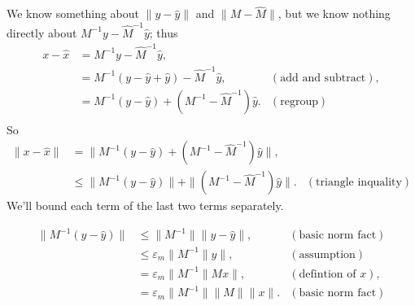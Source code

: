 \documentclass[usenames,dvipsnames,fleqn]{beamer}
\theoremstyle{definition}
\begin{document}
\begin{frame}

We know something about \(\| y - \widehat y\| \) and  \( \| M  - \widehat M \| \), but we know nothing directly about
\(M^{-1} y - \widehat M^{-1} \widehat y\); thus
\begin{align*}
   x - \widehat x &= M^{-1} y - \widehat M^{-1} \widehat y, \\
       &=M^{-1} \left(y - \widehat y + \widehat y \right)  - \widehat M^{-1} \widehat y, &(\mbox{add and subtract}), \\
       &= M^{-1} \left(y - \widehat y \right) + \left(M^{-1} - \widehat M^{-1} \right) \widehat y.  &(\mbox{regroup})\\
\end{align*}
So
\begin{align*}
  \|  x - \widehat x \| &= \|M^{-1} \left(y - \widehat y \right) + \left(M^{-1} - \widehat M^{-1} \right) \widehat y \|,\\
       &\leq  \|M^{-1} \left(y - \widehat y \right) \| + \| \left(M^{-1} - \widehat M^{-1} \right) \widehat y \|. &(\mbox{triangle inquality})
\end{align*}
We'll bound each term of the last two terms separately.

\end{frame}
\begin{frame}

\begin{align*}
   \|M^{-1} \left(y - \widehat y \right) \| &\leq \| M^{-1} \| \| y - \widehat y  \|,  &(\mbox{basic norm fact}) \\
               &\leq  \varepsilon_m \| M^{-1} \| y  \|, &(\mbox{assumption}) \\
               &= \varepsilon_m \| M^{-1} \| M x  \|,  &(\mbox{defintion of } x ), \\
               &=  \varepsilon_m \| M^{-1} \|  \| M  \| \|x  \|.  &(\mbox{basic norm fact}) 
\end{align*}
\end{frame}
\end{document}
